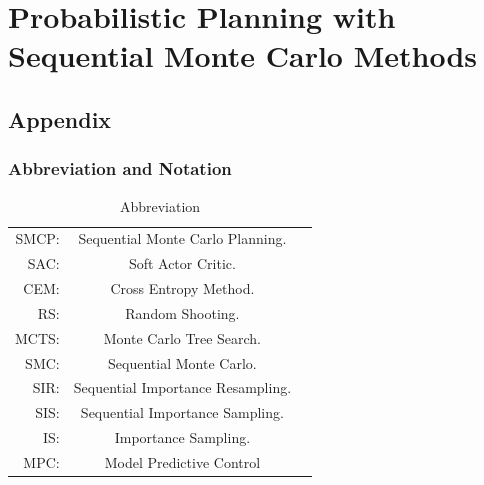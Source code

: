 \chapter{Probabilistic Planning with Sequential Monte Carlo Methods}
\section{Appendix}
\label{sec:appendix}

\subsection{Abbreviation and Notation}
\label{app:notation}
\begin{table}[H]\caption{Abbreviation}
\begin{center}%
\begin{tabular}{r c p{10cm} }
\toprule
SMCP: & Sequential Monte Carlo Planning.\\
SAC: & Soft Actor Critic.\\
CEM: & Cross Entropy Method.\\
RS: & Random Shooting.\\
MCTS: & Monte Carlo Tree Search.\\
SMC: & Sequential Monte Carlo.\\
SIR: & Sequential Importance Resampling.\\
SIS: & Sequential Importance Sampling.\\
IS: & Importance Sampling.\\
MPC: & Model Predictive Control\\
\bottomrule
\end{tabular}
\end{center}
\label{tab:abbreviation}
\end{table}

